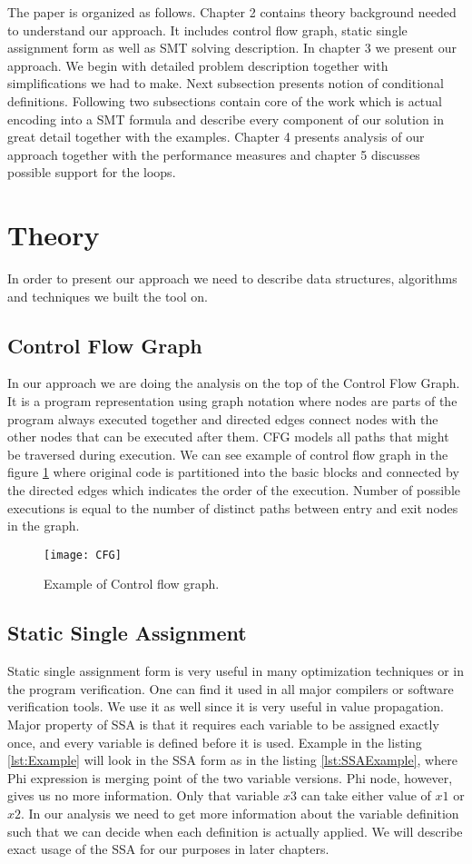\documentclass[letterpaper,12pt]{article}
\begin{document}
The paper is organized as follows. Chapter 2 contains theory background needed to understand our approach. It includes control flow graph, static single assignment form as well as SMT solving description. In chapter 3 we present our approach. We begin with detailed problem description together with simplifications we had to make. Next subsection presents notion of conditional definitions. Following two subsections contain core of the work which is actual encoding into a SMT formula and describe every component of our solution in great detail together with the examples. Chapter 4 presents analysis of our approach together with the performance measures and chapter 5 discusses possible support for the loops.


\section{Theory}
In order to present our approach we need to describe data structures, algorithms and techniques we built the tool on.
\subsection{Control Flow Graph}
In our approach we are doing the analysis on the top of the Control Flow Graph. It is a program representation using graph notation where nodes are parts of the program always executed together and directed edges connect nodes with the other nodes that can be executed after them. CFG models all paths that might be traversed during execution. We can see example of control flow graph in the figure \ref{fig:cfg} where original code is partitioned into the basic blocks and connected by the directed edges which indicates the order of the execution. Number of possible executions is equal to the number of distinct paths between entry and exit nodes in the graph.
 
\begin{figure}[ht] 
    \centering \texttt{[image: CFG]}
    \caption{
    \label{fig:cfg}
        Example of Control flow graph.
    }
\end{figure}

\subsection{Static Single Assignment}
Static single assignment form is very useful in many optimization techniques or in the program verification. One can find it used in all major compilers or software verification tools. We use it as well since it is very useful in value propagation. Major property of SSA is that it requires each variable to be assigned exactly once, and every variable is defined before it is used. Example in the listing \ref{lst:Example} will look in the SSA form as in the listing \ref{lst:SSAExample}, where Phi expression is merging point of the two variable versions. Phi node, however, gives us no more information. Only that variable $x3$ can take either value of $x1$ or $x2$. In our analysis we need to get more information about the variable definition such that we can decide when each definition is actually applied. We will describe exact usage of the SSA for our purposes in later chapters. 
\end{document}
